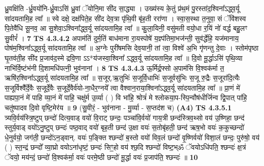 \documentclass[17pt]{extarticle}
\begin{document}
                  ध्रु॒वक्षि॑ति -र्ध्रु॒वयो॑नि-र्ध्रु॒वाऽसि॑ ध्रु॒वां ॅयोनि॒मा सी॑द सा॒द्ध्या । उख्य॑स्य के॒तुं प्र॑थ॒मं पु॒रस्ता॑द॒श्विना᳚ऽद्ध्व॒र्यू सा॑दयतामि॒ह त्वा᳚ ॥ स्वे दक्षे॒ दक्ष॑पिते॒ह सी॑द देव॒त्रा पृ॑थि॒वी बृ॑ह॒ती ररा॑णा । स्वा॒स॒स्था त॒नुवा॒ सं ॅवि॑शस्व पि॒तेवै॑धि सू॒नव॒ आ सु॒शेवा॒ऽश्विना᳚द्ध्व॒र्यू सा॑दयतामि॒ह त्वा᳚ ॥ कु॒ला॒यिनी॒ वसु॑मती वयो॒धा र॒यिं नो॑ वर्द्ध बहु॒लꣳ सु॒वीरं᳚ । \textbf{  7 } \newline
                  \newline
                                \textbf{ TS 4.3.4.2} \newline
                  अपाम॑तिं दुर्म॒तिं बाध॑माना रा॒यस्पोषे॑ य॒ज्ञ्प॑तिमा॒भज॑न्ती॒ सुव॑र्द्धेहि॒ यज॑मानाय॒ पोष॑म॒श्विना᳚ऽद्ध्व॒र्यू सा॑दयतामि॒ह त्वा᳚ ॥ अ॒ग्नेः पुरी॑षमसि देव॒यानी॒ तां त्वा॒ विश्वे॑ अ॒भि गृ॑णन्तु दे॒वाः । स्तोम॑पृष्ठा घृ॒तव॑ती॒ह सी॑द प्र॒जाव॑द॒स्मे द्रवि॒णा ऽऽ*य॑जस्वा॒श्विना᳚ ऽद्ध्व॒र्यू सा॑दयतामि॒ह त्वा᳚ ॥ दि॒वो मू॒र्द्धाऽसि॑ पृथि॒व्या नाभि॑र्वि॒ष्टंभ॑नी दि॒शामधि॑पत्नी॒ भुव॑नानां । \textbf{  8} \newline
                  \newline
                                \textbf{ TS 4.3.4.3} \newline
                  ऊ॒र्मिर्द्र॒फ्सो अ॒पाम॑सि वि॒श्वक॑र्मा त॒ ऋषि॑र॒श्विना᳚ऽद्ध्व॒र्यू सा॑दयतामि॒ह त्वा᳚ ॥ स॒जूर्.ऋ॒तुभिः॑ स॒जूर्वि॒धाभिः॑ स॒जूर्वसु॑भिः स॒जू रु॒द्रैः स॒जूरा॑दि॒त्यैः स॒जूर्विश्वै᳚र्दे॒वैः स॒जूर्दे॒वैः स॒जूर्दे॒वैर्व॑यो-ना॒धैर॒ग्नये᳚ त्वा वैश्वान॒राया॒श्विना᳚ऽद्ध्व॒र्यू सा॑दयतामि॒ह त्वा᳚ ॥ प्रा॒णं मे॑ पाह्यपा॒नं मे॑ पाहि व्या॒नं मे॑ पाहि॒ चक्षु॑र्म उ॒र्व्या ( ) वि भा॑हि॒ श्रोत्रं॑ मे श्लोकया॒प-स्पि॒न्वौष॑धीर्जिन्व द्वि॒पात् पा॑हि॒ चतु॑ष्पादव दि॒वो वृष्टि॒मेर॑य ॥ \textbf{  9 } \newline
                  \newline
                      (सु॒वीरं॒ - भुव॑नाना - मु॒र्व्या - स॒प्तद॑श च)  \textbf{(A4)} \newline \newline
                                        \textbf{ TS 4.3.5.1} \newline
                  त्र्यवि॒र्वय॑स्त्रि॒ष्टुप् छन्दो॑ दित्य॒वाड् वयो॑ वि॒राट् छन्दः॒ पञ्चा॑वि॒र्वयो॑ गाय॒त्री छन्द॑स्त्रिव॒थ्सो वय॑ उ॒ष्णिहा॒ छन्द॑ स्तुर्य॒वाड् वयो॑ऽनु॒ष्टुप् छन्दः॑ पष्ठ॒वाद् वयो॑ बृह॒ती छन्द॑ उ॒क्षा वयः॑ स॒तोबृ॑हती॒ छन्द॑ ऋष॒भो वयः॑ क॒कुच्छन्दो॑ धे॒नुर्वयो॒ जग॑ती॒ छन्दो॑ऽन॒ड्वान्. वयः॑ प॒ङ्क्ति श्छन्दो॑ ब॒स्तो वयो॑ विव॒लं छन्दो॑ वृ॒ष्णिर्वयो॑ विशा॒लं छन्दः॒ पुरु॑षो॒ वय॑ ( ) स्त॒न्द्रं छन्दो᳚ व्या॒घ्रो वयोऽना॑धृष्टं॒ छन्दः॑ सिꣳ॒॒हो वय॑ श्छ॒दि श्छन्दो॑ विष्ट॒भ्ॐ ॅवयोऽधि॑पति॒ श्छन्दः॑ क्ष॒त्रं ॅवयो॒ मय॑न्दं॒ छन्दो॑ वि॒श्वक॑र्मा॒ वयः॑ परमे॒ष्ठी छन्दो॑ मू॒र्द्धा वयः॑ प्र॒जाप॑ति॒ श्छन्दः॑ ॥ \textbf{  10 } \newline
\end{document}
